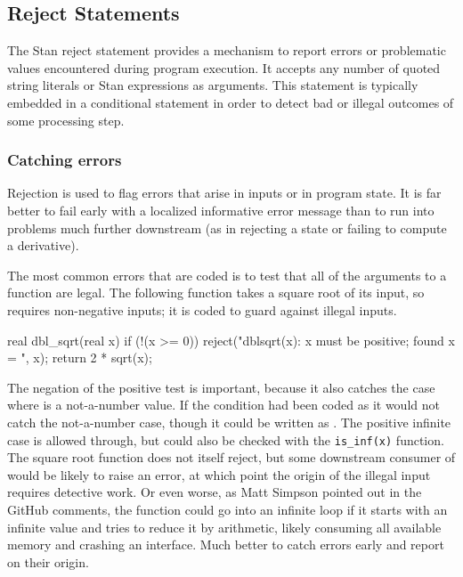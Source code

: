 \subsection{Reject Statements}

The Stan reject statement provides a mechanism to report errors or
problematic values encountered during program execution.  It accepts
any number of quoted string literals or Stan expressions as arguments.
This statement is typically embedded in a conditional statement in
order to detect bad or illegal outcomes of some processing step.

\subsubsection{Catching errors}

Rejection is used to flag errors that arise in inputs or in program
state.  It is far better to fail early with a localized informative
error message than to run into problems much further downstream (as in
rejecting a state or failing to compute a derivative).

The most common errors that are coded is to test that all of the
arguments to a function are legal.  The following function takes a
square root of its input, so requires non-negative inputs; it is coded
to guard against illegal inputs.
%
\begin{stancode}
real dbl_sqrt(real x) {
  if (!(x >= 0))
    reject("dblsqrt(x): x must be positive; found x = ", x);
  return 2 * sqrt(x);
}
\end{stancode}
%
The negation of the positive test is important, because it also
catches the case where  is a not-a-number value.  If the
condition had been coded as  it would not catch the
not-a-number case, though it could be written as
.  The positive infinite case is allowed
through, but could also be checked with the \Verb/is_inf(x)/ function.
The square root function does not itself reject, but some downstream
consumer of  would be likely to raise an error, at
which point the origin of the illegal input requires detective work.
Or even worse, as Matt Simpson pointed out in the GitHub comments, the
function could go into an infinite loop if it starts with an infinite
value and tries to reduce it by arithmetic, likely consuming all
available memory and crashing an interface.  Much better to catch
errors early and report on their origin.

